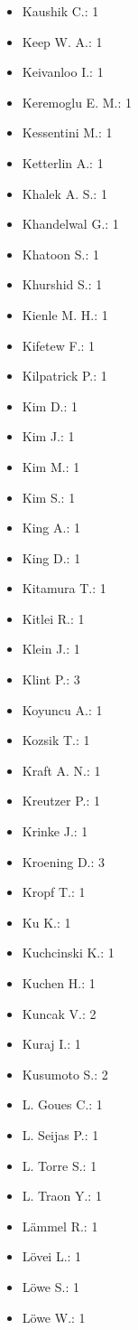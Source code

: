 \begin{itemize}
\item Kaushik C.: 1
\item Keep W. A.: 1
\item Keivanloo I.: 1
\item Keremoglu E. M.: 1
\item Kessentini M.: 1
\item Ketterlin A.: 1
\item Khalek A. S.: 1
\item Khandelwal G.: 1
\item Khatoon S.: 1
\item Khurshid S.: 1
\item Kienle M. H.: 1
\item Kifetew F.: 1
\item Kilpatrick P.: 1
\item Kim D.: 1
\item Kim J.: 1
\item Kim M.: 1
\item Kim S.: 1
\item King A.: 1
\item King D.: 1
\item Kitamura T.: 1
\item Kitlei R.: 1
\item Klein J.: 1
\item Klint P.: 3
\item Koyuncu A.: 1
\item Kozsik T.: 1
\item Kraft A. N.: 1
\item Kreutzer P.: 1
\item Krinke J.: 1
\item Kroening D.: 3
\item Kropf T.: 1
\item Ku K.: 1
\item Kuchcinski K.: 1
\item Kuchen H.: 1
\item Kuncak V.: 2
\item Kuraj I.: 1
\item Kusumoto S.: 2
\item L. Goues C.: 1
\item L. Seijas P.: 1
\item L. Torre S.: 1
\item L. Traon Y.: 1
\item L\"{a}mmel R.: 1
\item L\"{o}vei L.: 1
\item L\"{o}we S.: 1
\item L\"{o}we W.: 1

\end{itemize}
